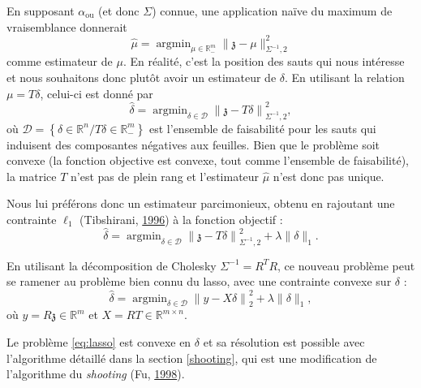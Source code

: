 \documentclass[12pt,a4paper]{reedthesis}
\newcommand \RR {\mathbb{R}}
\newcommand \shiftset {\mathcal{D}}
\newcommand \ou [1]{{#1}_{\text{ou}}}
\newcommand \zs {\mathfrak{z}}
\newcommand \shifts {\delta}
\DeclareMathOperator*{\argmin}{argmin}
\theoremstyle{definition}
\theoremstyle{definition}
\theoremstyle{definition}
\theoremstyle{remark}
\begin{document}
En supposant \(\ou{\alpha}\) (et donc \(\Sigma\)) connue, une application naïve du maximum de vraisemblance donnerait
\begin{equation*}
\hat{\mu} = \argmin_{\mu\in\mathbb{R}_-^m} \|\zs - \mu\|_{\Sigma^{-1}, 2}^2
\end{equation*}
comme estimateur de \(\mu\). En réalité, c'est la position des sauts qui nous intéresse et nous souhaitons donc plutôt avoir un estimateur de \(\shifts\). En utilisant la relation \(\mu = T\shifts\), celui-ci est donné par
\begin{equation*}
\hat{\delta} = \argmin_{\shifts \in \shiftset} \left\|\zs - T\shifts\right\|_{\Sigma^{-1},2}^2,
\end{equation*}
où \(\shiftset = \left\{\shifts\in \mathbb{R}^{n} / T\shifts \in\mathbb{R}_-^m\right\}\) est l'ensemble de faisabilité pour les sauts qui induisent des composantes négatives aux feuilles. Bien que le problème soit convexe (la fonction objective est convexe, tout comme l'ensemble de faisabilité), la matrice \(T\) n'est pas de plein rang et l'estimateur \(\hat{\mu}\) n'est donc pas unique.

Nous lui préférons donc un estimateur parcimonieux, obtenu en rajoutant une contrainte \(\ell_1\) (Tibshirani, \protect\hyperlink{ref-tibshirani1996regression}{1996}) à la fonction objectif :
\begin{equation*}
\hat{\shifts} = \argmin_{\shifts \in \shiftset} \left\|\zs - T\shifts\right\|_{\Sigma^{-1},2}^2 + \lambda \|\shifts\|_1.
\end{equation*}
\newline

En utilisant la décomposition de Cholesky \(\Sigma^{-1} = R^TR\), ce nouveau problème peut se ramener au problème bien connu du lasso, avec une contrainte convexe sur \(\shifts\) :
\begin{equation}
\label{eq:lasso}
\hat{\shifts} = \argmin_{\shifts \in \shiftset} \left\|y - X\shifts\right\|_2^2 + \lambda \|\shifts\|_1,
\end{equation}
où \(y = R\zs \in \RR^m\) et \(X = RT \in \RR^{m \times n}\).

Le problème \eqref{eq:lasso} est convexe en \(\shifts\) et sa résolution est possible avec l'algorithme détaillé dans la section \ref{shooting}, qui est une modification de l'algorithme du \emph{shooting} (Fu, \protect\hyperlink{ref-fu1998penalized}{1998}).
\end{document}
